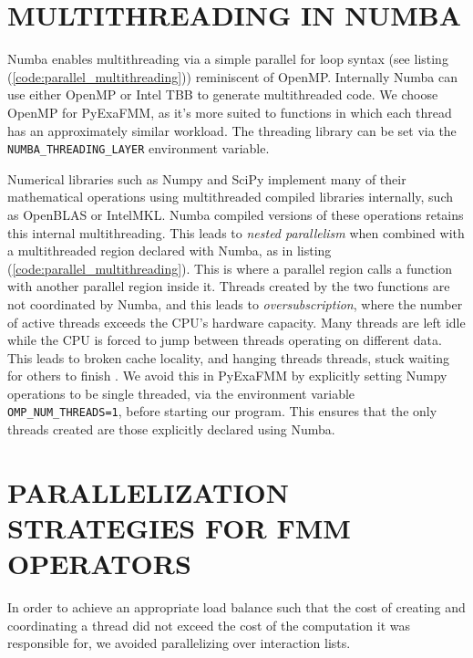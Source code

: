 \documentclass{IEEEcsmag}
\begin{document}
\section{MULTITHREADING IN NUMBA}

Numba enables multithreading via a simple parallel for loop syntax (see listing (\ref{code:parallel_multithreading})) reminiscent of OpenMP. Internally Numba can use either OpenMP or Intel TBB to generate multithreaded code. We choose OpenMP for PyExaFMM, as it's more suited to functions in which each thread has an approximately similar workload. The threading library can be set via the \lstinline{NUMBA_THREADING_LAYER} environment variable.

Numerical libraries such as Numpy and SciPy implement many of their mathematical operations using multithreaded compiled libraries internally, such as OpenBLAS or IntelMKL. Numba compiled versions of these operations retains this internal multithreading. This leads to \textit{nested parallelism} when combined with a multithreaded region declared with Numba, as in listing (\ref{code:parallel_multithreading}). This is where a parallel region calls a function with another parallel region inside it. Threads created by the two functions are not coordinated by Numba, and this leads to \textit{oversubscription}, where the number of active threads exceeds the CPU's hardware capacity. Many threads are left idle while the CPU is forced to jump between threads operating on different data. This leads to broken cache locality, and hanging threads threads, stuck waiting for others to finish \cite{Malakhov2016}. We avoid this in PyExaFMM by explicitly setting Numpy operations to be single threaded, via the environment variable \lstinline{OMP_NUM_THREADS=1}, before starting our program. This ensures that the only threads created are those explicitly declared using Numba.



\section{PARALLELIZATION STRATEGIES FOR FMM OPERATORS}

In order to achieve an appropriate load balance such that the cost of creating and coordinating a thread did not exceed the cost of the computation it was responsible for, we avoided parallelizing over interaction lists.
\end{document}
